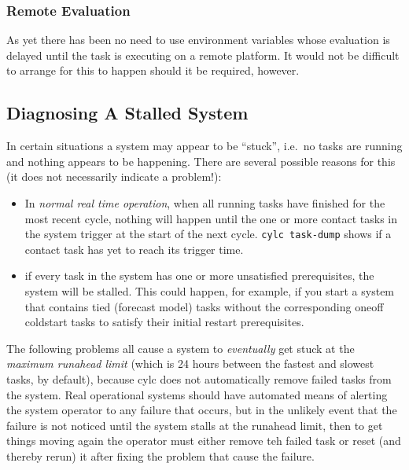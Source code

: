 \documentclass[11pt,a4paper]{article}
\begin{document}
\subsubsection{Remote Evaluation}

As yet there has been no need to use environment variables whose
evaluation is delayed until the task is executing on a remote platform.
It would not be difficult to arrange for this to happen should it be
required, however.

\subsection{Diagnosing A Stalled System}
\label{DiagnosingAStalledSystem}

In certain situations a system may appear to be ``stuck'', i.e.\ no
tasks are running and nothing appears to be happening. There are several 
possible reasons for this (it does not necessarily indicate a problem!):

\begin{itemize}
    \item In {\em normal real time operation}, when all running tasks
        have finished for the most recent cycle, nothing will happen
        until the one or more contact tasks in the system trigger at the
        start of the next cycle. \lstinline=cylc task-dump= shows if a
        contact task has yet to reach its trigger time.

    \item if every task in the system has one or more unsatisfied
        prerequisites, the system will be stalled. This could happen,
        for example, if you start a system that contains tied (forecast
        model) tasks without the corresponding oneoff coldstart tasks to
        satisfy their initial restart prerequisites.

\end{itemize}

The following problems all cause a system to {\em eventually} get stuck 
at the {\em maximum runahead limit} (which is 24 hours between the
fastest and slowest tasks, by default), because cylc does not
automatically remove failed tasks from the system.  Real operational
systems should have automated means of alerting the system operator to
any failure that occurs, but in the unlikely event that the failure 
is not noticed until the system stalls at the runahead limit, then to
get things moving again the operator must either remove teh failed task
or reset (and thereby rerun) it after fixing the problem that cause the
failure.
\end{document}
